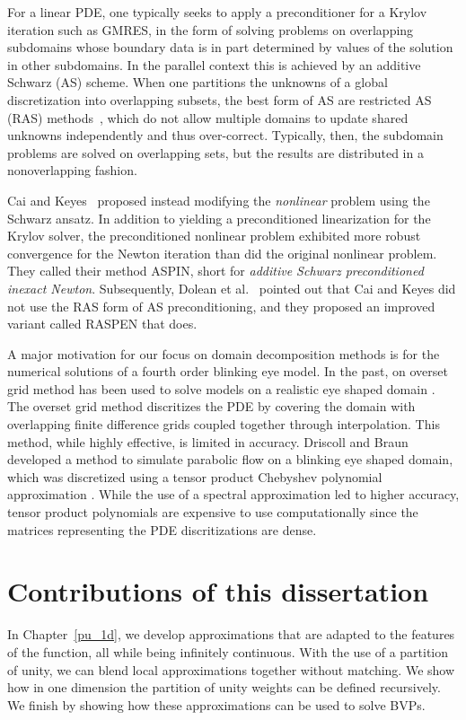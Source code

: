 For a linear PDE, one typically seeks to apply a preconditioner for a Krylov iteration such as GMRES, in the form of solving problems on overlapping subdomains whose boundary data is in part determined by values of the solution in other subdomains. In the parallel context this is achieved by an additive Schwarz (AS) scheme. When one partitions the unknowns of a global discretization into overlapping subsets, the best form of AS are restricted AS (RAS) methods~\cite{Cai1999}, which do not allow multiple domains to update shared unknowns independently and thus over-correct. Typically, then, the subdomain problems are solved on overlapping sets, but the results are distributed in a nonoverlapping fashion. 
%

Cai and Keyes~\cite{Cai2002} proposed instead modifying the \emph{nonlinear} problem using the Schwarz ansatz. In addition to yielding a preconditioned linearization for the Krylov solver, the preconditioned nonlinear problem exhibited more robust convergence for the Newton iteration than did the original nonlinear problem. They called their method ASPIN, short for \textit{additive Schwarz preconditioned inexact Newton}. Subsequently, Dolean et al.~\cite{Dolean2016} pointed out that Cai and Keyes did not use the RAS form of AS preconditioning, and they proposed an improved variant called RASPEN that does. %

A major motivation for our focus on domain decomposition methods is for the numerical solutions of a fourth order blinking eye model. In the past, on overset grid method has been used to solve models on a realistic eye shaped domain \cite{chesshire1990composite,henshaw1998ogen,li2012model,li2015computed}. The overset grid method discritizes the PDE by covering the domain with overlapping finite difference grids coupled together through interpolation. This method, while highly effective, is limited in accuracy. Driscoll and Braun developed a method to simulate parabolic flow on a blinking eye shaped domain, which was discretized using a tensor product Chebyshev polynomial approximation \cite{driscoll2018simulation}. While the use of a spectral approximation led to higher accuracy, tensor product polynomials are expensive to use computationally since the matrices representing the PDE discritizations are dense.

\section{Contributions of this dissertation}
 In Chapter~\ref{pu_1d}, we develop approximations that are adapted to the features of the function, all while being infinitely continuous. With the use of a partition of unity, we can blend local approximations together without matching. We show how in one dimension the partition of unity weights can be defined recursively. We finish by showing how these approximations can be used to solve BVPs.
 
